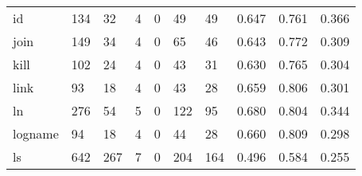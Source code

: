 \begin{longtable}{lp{1.3cm}p{1.3cm}p{1.3cm}p{1.3cm}p{1.3cm}p{1.3cm}p{1.3cm}p{1.3cm}p{1.3cm}}
id        &                    134 &                                 32 &                                 4 &                                0 &                                49 &                              49 &                                0.647 &                                  0.761 &                                0.366 \\
join      &                    149 &                                 34 &                                 4 &                                0 &                                65 &                              46 &                                0.643 &                                  0.772 &                                0.309 \\
kill      &                    102 &                                 24 &                                 4 &                                0 &                                43 &                              31 &                                0.630 &                                  0.765 &                                0.304 \\
link      &                     93 &                                 18 &                                 4 &                                0 &                                43 &                              28 &                                0.659 &                                  0.806 &                                0.301 \\
ln        &                    276 &                                 54 &                                 5 &                                0 &                               122 &                              95 &                                0.680 &                                  0.804 &                                0.344 \\
logname   &                     94 &                                 18 &                                 4 &                                0 &                                44 &                              28 &                                0.660 &                                  0.809 &                                0.298 \\
ls        &                    642 &                                267 &                                 7 &                                0 &                               204 &                             164 &                                0.496 &                                  0.584 &                                0.255 \\

\end{longtable}
